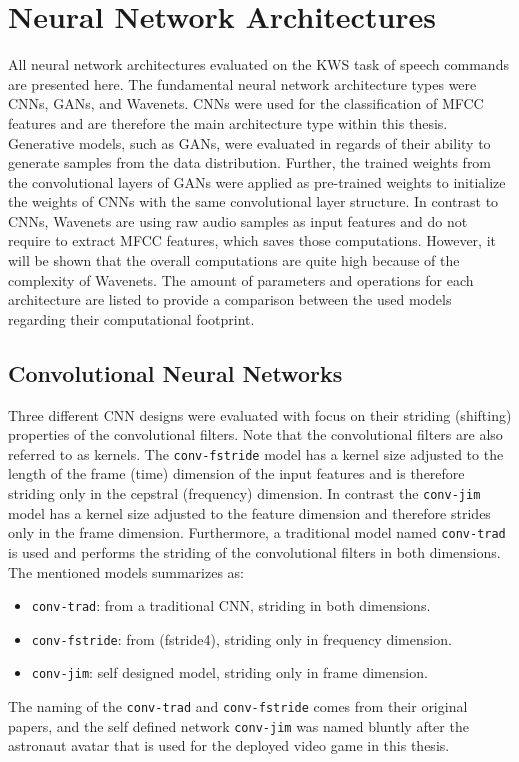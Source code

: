 
\section{Neural Network Architectures}\label{sec:nn_arch}
All neural network architectures evaluated on the KWS task of speech commands are presented here.
The fundamental neural network architecture types were CNNs, GANs, and Wavenets.
CNNs were used for the classification of MFCC features and are therefore the main architecture type within this thesis.
Generative models, such as GANs, were evaluated in regards of their ability to generate samples from the data distribution.
Further, the trained weights from the convolutional layers of GANs were applied as pre-trained weights to initialize the weights of CNNs with the same convolutional layer structure.
In contrast to CNNs, Wavenets are using raw audio samples as input features and do not require to extract MFCC features, which saves those computations.
However, it will be shown that the overall computations are quite high because of the complexity of Wavenets.
The amount of parameters and operations for each architecture are listed to provide a comparison between the used models regarding their computational footprint.



\subsection{Convolutional Neural Networks}\label{sec:nn_arch_cnn}
Three different CNN designs were evaluated with focus on their striding (shifting) properties of the convolutional filters.
Note that the convolutional filters are also referred to as kernels.
The \texttt{conv-fstride} model has a kernel size adjusted to the length of the frame (time) dimension of the input features and is therefore striding only in the cepstral (frequency) dimension.
In contrast the \texttt{conv-jim} model has a kernel size adjusted to the feature dimension and therefore strides only in the frame dimension.
Furthermore, a traditional model named \texttt{conv-trad} is used and performs the striding of the convolutional filters in both dimensions.
The mentioned models summarizes as:
\begin{itemize}
	\item \texttt{conv-trad}: from \cite{Sainath2015} a traditional CNN, striding in both dimensions.
	\item \texttt{conv-fstride}: from \cite{Sainath2015} (fstride4), striding only in frequency dimension.
	\item \texttt{conv-jim}: self designed model, striding only in frame dimension.
\end{itemize}
The naming of the \texttt{conv-trad} and \texttt{conv-fstride} comes from their original papers, and the self defined network \texttt{conv-jim} was named bluntly after the astronaut avatar that is used for the deployed video game in this thesis.

